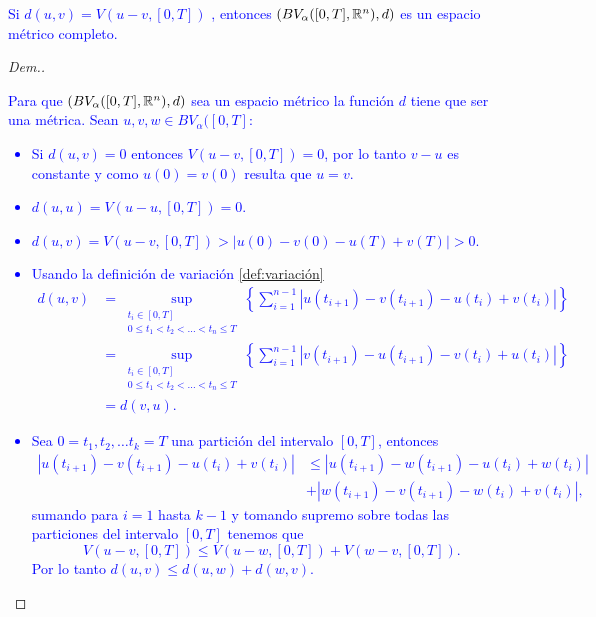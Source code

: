     
\begin{prop}\textcolor{blue}{ \label{pro:completo}
     Si $d(u,v)=V(u-v,[0,T])$ , entonces $\left(BV_\alpha([0,T],\mathbb{R}^n),d\right)$ es un espacio métrico completo.}
\end{prop}
\begin{proof}[Dem.]
    \textcolor{blue}{Para que $\left(BV_\alpha([0,T],\mathbb{R}^n),d\right)$ sea un espacio métrico la función $d$ tiene que ser una métrica. Sean $u,v,w\in BV_\alpha([0,T]$:
\begin{itemize}
\item Si $d(u,v)=0$ entonces $V(u-v,[0,T])=0$, por lo tanto $v-u$ es constante y como $u(0)=v(0)$ resulta que $u=v$. 
\item $d(u,u)=V(u-u,[0,T])=0$. 
\item $d(u,v)=V(u-v,[0,T])>|u(0)-v(0)-u(T)+v(T)|>0$.
\item Usando la definición de variación \ref{def:variación}
\begin{equation*}
    \begin{split}
    d(u,v)&=\sup_{\substack{ t_i\in [0,T]\\
0\leq t_1 < t_2< \dots < t_n  \leq T}}\left\lbrace \sum_{i=1}^{n-1}|u(t_{i+1})-v(t_{i+1})-u(t_i)+v(t_{i})|\right\rbrace\\&=
\sup_{\substack{ t_i\in [0,T]\\
0\leq t_1 < t_2< \dots < t_n  \leq T}}\left\lbrace \sum_{i=1}^{n-1}|v(t_{i+1})-u(t_{i+1})-v(t_i)+u(t_{i})|\right\rbrace\\&=d(v,u).
    \end{split}
\end{equation*}
\item Sea $0=t_1,t_2,\ldots t_k=T$ una partición del intervalo $[0,T]$, entonces
\begin{equation*}
    \begin{split}
        |u(t_{i+1})-v(t_{i+1})-u(t_i)+v(t_{i})|&   \leq |u(t_{i+1})-w(t_{i+1})-u(t_i)+w(t_{i})|\\&+ |w(t_{i+1})-v(t_{i+1})-w(t_i)+v(t_{i})|,
    \end{split}
\end{equation*}
sumando para $i=1$ hasta $k-1$ y tomando supremo sobre todas las particiones del intervalo $[0,T]$ tenemos que 
$$V(u-v,[0,T])\leq V(u-w,[0,T])+V(w-v,[0,T]).$$
Por lo tanto $d(u,v)\leq d(u,w)+d(w,v)$.
    \end{itemize}
}
\end{proof}
